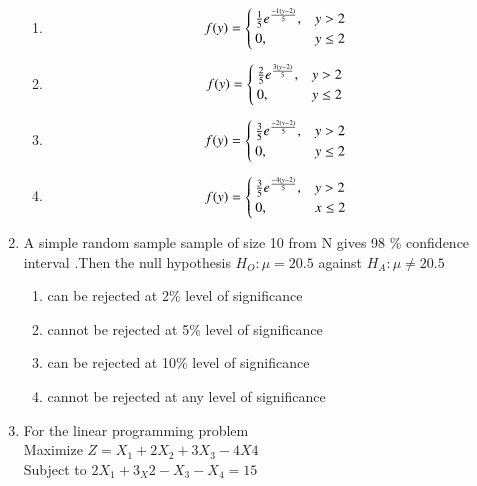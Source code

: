 \documentclass[journal]{IEEEtran}
\begin{document}
\begin{enumerate}[start=1]
    \begin{multicols}{2}
        \begin{enumerate}
            \item 
            \[
           f(y)=\begin{cases}
           \frac{1}{5} e^{\frac{-1\left(y-2\right)}{5}}, & y > 2 \\
            0, & y \leq 2
           \end{cases}
           \]
           \item 
            \[
           f(y)=\begin{cases}
           \frac{2}{5} e^{\frac{3\left(y-2\right)}{5}}, & y > 2 \\
            0, & y \leq 2
           \end{cases}
           \]
           \item 
            \[
           f(y)=\begin{cases}
           \frac{3}{5} e^{\frac{-2\left(y-2\right)}{5}}, & y > 2 \\
            0, & y \leq 2
           \end{cases}
           \]
           \item 
            \[
           f(y)=\begin{cases}
           \frac{3}{5} e^{\frac{-4\left(y-2\right)}{5}}, & y > 2 \\
            0, & x \leq 2
           \end{cases}
           \]
        \end{enumerate}
    \end{multicols}
\item A simple random sample sample of size 10 from N gives 98 \% confidence interval .Then the null hypothesis $H_O : \mu =20.5$ against $H_A: \mu\neq20.5$
\begin{enumerate}
    \item can be rejected at 2\%  level of significance
    \item cannot be rejected at 5\% level of significance 
    \item can be rejected at 10\% level of significance 
    \item cannot be rejected at any level of significance 
\end{enumerate}
\item For the linear programming problem \\
\hspace{2cm} Maximize \hspace{2cm} $Z=X_1+2X_2+3X_3-4X4$\\
\hspace{2cm} Subject to \hspace{2.5cm} $2X_1+3_X2-X_3-X_4=15$


\end{enumerate}
\end{document}
